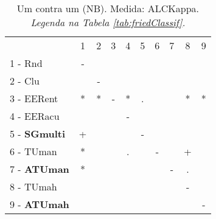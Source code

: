 \begin{table}[h]
\caption{Um contra um (NB). Medida: ALCKappa. \textit{Legenda na Tabela \ref{tab:friedClassif}.}}
\begin{center}\begin{tabular}{lcc|cc|cc|cc|c}
 			& 1 & 2 & 3 & 4 & 5 & 6 & 7 & 8 & 9\\
1 - Rnd  	& - &   &   &   &   &   &   &   &   \\
2 - Clu  	&   & - &   &   &   &   &   &   &   \\ \hline
3 - EERent	& * & * & - & * & . &   &   & * & * \\
4 - EERacu	&   &   &   & - &   &   &   &   &   \\ \hline
5 - \textbf{SGmulti}	& + &   &   &   & - &   &   &   &   \\
6 - TUman	& * &   &   & . &   & - &   & + &   \\ \hline
7 - \textbf{ATUman}	& * &   &   &   &   &   & - & . &   \\
8 - TUmah	&   &   &   &   &   &   &   & - &   \\ \hline
9 - \textbf{ATUmah}	&   &   &   &   &   &   &   &   & - \\\end{tabular}
\label{stratsALCKappaFriedNBRedux}
\end{center}
\end{table}